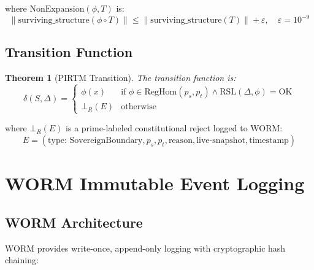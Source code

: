 \documentclass[11pt,a4paper]{article}
\newtheorem{theorem}{Theorem}[section]
\begin{document}
where $\text{NonExpansion}(\phi, T)$ is:
$$\|\text{surviving\_structure}(\phi \circ T)\| \leq \|\text{surviving\_structure}(T)\| + \varepsilon, \quad \varepsilon = 10^{-9}$$

\subsection{Transition Function}

\begin{theorem}[PIRTM Transition]\label{thm:transition}
The transition function is:
\begin{equation}\label{eq:transition}
\delta(S, \Delta) =
\begin{cases}
\phi(x) & \text{if } \phi \in \text{RegHom}(p_s, p_t) \land \text{RSL}(\Delta, \phi) = \text{OK} \\
\bot_R(E) & \text{otherwise}
\end{cases}
\end{equation}
\end{theorem}

where $\bot_R(E)$ is a prime-labeled constitutional reject logged to WORM:
$$E = (\text{type: SovereignBoundary}, p_s, p_t, \text{reason}, \text{live-snapshot}, \text{timestamp})$$

\section{WORM Immutable Event Logging}

\subsection{WORM Architecture}

WORM provides write-once, append-only logging with cryptographic hash chaining:
\end{document}
